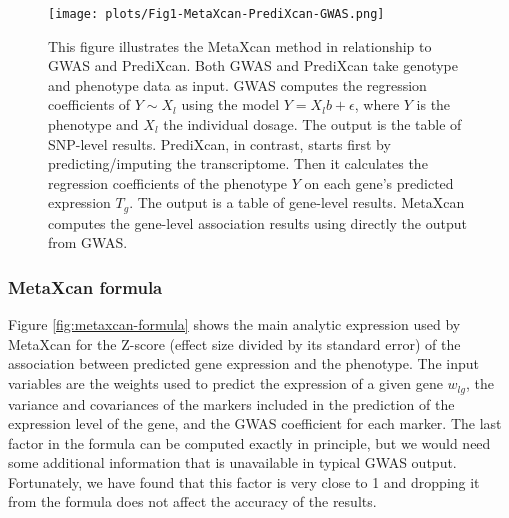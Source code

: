\documentclass[10pt]{article}
\begin{document}
\begin{figure}
\texttt{[image: plots/Fig1-MetaXcan-PrediXcan-GWAS.png]}
\caption{This figure illustrates the MetaXcan method in relationship to GWAS and PrediXcan. Both GWAS and PrediXcan take genotype and phenotype data as input. GWAS computes the regression coefficients of $Y\sim X_l$ using the model $Y=X_l b + \epsilon$, where $Y$ is the phenotype and $X_l$ the individual dosage. The output is the table of SNP-level results. PrediXcan, in contrast, starts first by predicting/imputing the transcriptome. Then it calculates the regression coefficients of the phenotype $Y$ on each gene's predicted expression $T_g$. The output is a table of gene-level results. MetaXcan computes the gene-level association results using directly the output from GWAS.} %
\label{fig:MetaXcan-PrediXcan-GWAS}
\end{figure}

\subsubsection*{MetaXcan formula}

Figure \ref{fig:metaxcan-formula} shows the main analytic expression used by MetaXcan for the Z-score (effect size divided by its standard error) of the association between predicted gene expression and the phenotype. The input variables are the weights used to predict the expression of a given gene $w_{lg}$, the variance and covariances of the markers included in the prediction of the expression level of the gene, and the GWAS coefficient for each marker. The last factor in the formula can be computed exactly in principle, but we would need some additional information that is unavailable in typical GWAS output. Fortunately, we have found that this factor is very close to 1 and dropping it from the formula does not affect the accuracy of the results.

\end{document}
